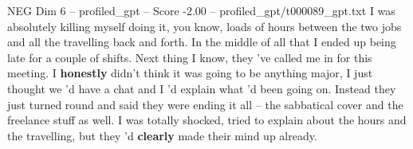 \begin{textsample}{NEG Dim 6 – profiled\_gpt – Score -2.00 – profiled\_gpt/t000089\_gpt.txt}  \label{ex:f6_neg_011}
I was absolutely killing myself doing it, you know, loads of hours between the two jobs and all the travelling back and forth.
In the middle of all that I ended up being late for a couple of shifts.
Next thing I know, they ’ve called me in for this meeting.
I \textbf{honestly} didn't think it was going to be anything major, I just thought we ’d have a chat and I ’d explain what ’d been going on.
Instead they just turned round and said they were ending it all – the sabbatical cover and the freelance stuff as well.
I was totally shocked, tried to explain about the hours and the travelling, but they ’d \textbf{clearly} made their mind up already.

\end{textsample}
